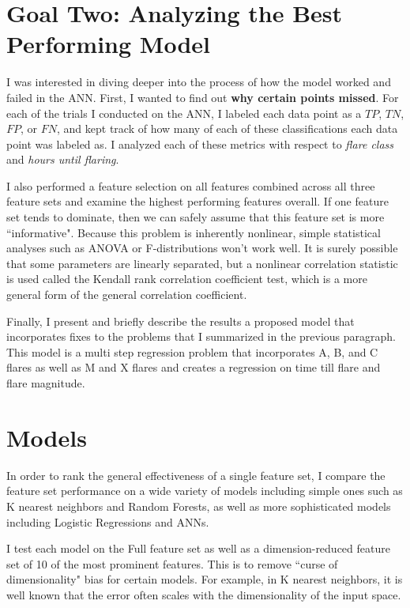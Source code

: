 \documentclass[defaultstyle,11pt]{thesis}
\begin{document}
\section{Goal Two: Analyzing the Best Performing Model}
I was interested in diving deeper into the process of how the model worked and failed in the ANN. First, I wanted to find out \textbf{why certain points missed}. For each of the trials I conducted on the ANN, I labeled each data point as a $TP$, $TN$, $FP$, or $FN$, and kept track of how many of each of these classifications each data point was labeled as. I analyzed each of these metrics with respect to \textit{flare class} and \textit{hours until flaring}.

I also performed a feature selection on all features combined across all three feature sets and examine the highest performing features overall. If one feature set tends to dominate, then we can safely assume that this feature set is more ``informative". Because this problem is inherently nonlinear, simple statistical analyses such as ANOVA or F-distributions won't work well. It is surely possible that some parameters are linearly separated, but a nonlinear correlation statistic is used called the Kendall rank correlation coefficient test, which is a more general form of the general correlation coefficient. 

Finally, I present and briefly describe the results a proposed model that incorporates fixes to the problems that I summarized in the previous paragraph. This model is a multi step regression problem that incorporates A, B, and C flares as well as M and X flares and creates a regression on time till flare and flare magnitude.

\section{Models}

In order to rank the general effectiveness of a single feature set, I compare the feature set performance on a wide variety of models including simple ones such as K nearest neighbors and Random Forests, as well as more sophisticated models including Logistic Regressions and ANNs.

I test each model on the Full feature set as well as a dimension-reduced feature set of 10 of the most prominent features. This is to remove ``curse of dimensionality" bias for certain models. For example, in K nearest neighbors, it is well known that the error often scales with the dimensionality of the input space. 
\end{document}
